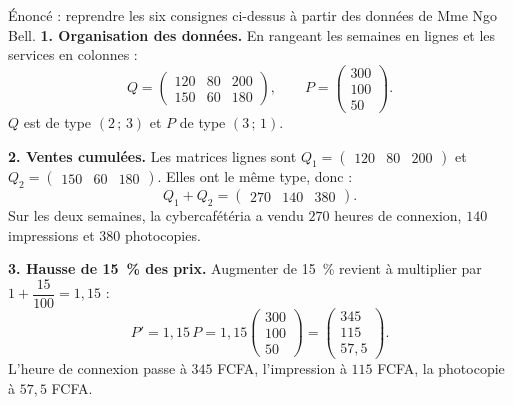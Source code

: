 \documentclass[11pt]{article}
\begin{document}
\begin{exoresolu}
Énoncé : reprendre les six consignes ci-dessus à partir des données de Mme Ngo Bell.
\tcblower
\textbf{1. Organisation des données.} En rangeant les semaines en lignes et les services en colonnes :
\[ Q=\begin{pmatrix} 120 & 80 & 200 \\ 150 & 60 & 180 \end{pmatrix}, \qquad P=\begin{pmatrix} 300 \\ 100 \\ 50 \end{pmatrix}. \]
$Q$ est de type $(2\,;\,3)$ et $P$ de type $(3\,;\,1)$.

\textbf{2. Ventes cumulées.} Les matrices lignes sont $Q_1=\begin{pmatrix} 120 & 80 & 200 \end{pmatrix}$ et $Q_2=\begin{pmatrix} 150 & 60 & 180 \end{pmatrix}$. Elles ont le même type, donc :
\[ Q_1+Q_2=\begin{pmatrix} 270 & 140 & 380 \end{pmatrix}. \]
Sur les deux semaines, la cybercafétéria a vendu $270$ heures de connexion, $140$ impressions et $380$ photocopies.

\textbf{3. Hausse de \SI{15}{\percent} des prix.} Augmenter de \SI{15}{\percent} revient à multiplier par $1+\dfrac{15}{100}=1{,}15$ :
\[ P'=1{,}15\,P=1{,}15\begin{pmatrix} 300 \\ 100 \\ 50 \end{pmatrix}=\begin{pmatrix} 345 \\ 115 \\ 57{,}5 \end{pmatrix}. \]
L'heure de connexion passe à $345$ FCFA, l'impression à $115$ FCFA, la photocopie à $57{,}5$ FCFA.


\end{exoresolu}
\end{document}
